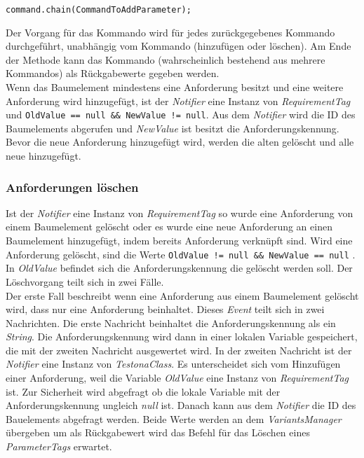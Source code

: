 \begin{lstlisting}
command.chain(CommandToAddParameter);
\end{lstlisting}

Der Vorgang für das Kommando wird für jedes zurückgegebenes Kommando durchgeführt, unabhängig vom Kommando (hinzufügen oder löschen). Am Ende der Methode kann das Kommando (wahrscheinlich bestehend aus mehrere Kommandos) als Rückgabewerte gegeben werden.\\


Wenn das Baumelement mindestens eine Anforderung besitzt und eine weitere Anforderung wird hinzugefügt, ist der \textit{Notifier} eine Instanz von \textit{RequirementTag} und \texttt{OldValue == null \&\& NewValue != null}. Aus dem \textit{Notifier} wird die ID des Baumelements abgerufen und \textit{NewValue} ist besitzt die Anforderungskennung. Bevor die neue Anforderung hinzugefügt wird, werden die alten gelöscht und alle neue hinzugefügt.\\


\subsubsection{Anforderungen löschen}
Ist der \textit{Notifier} eine Instanz von \textit{RequirementTag} so wurde eine Anforderung von einem Baumelement gelöscht oder es wurde eine neue Anforderung an einen Baumelement hinzugefügt, indem bereits Anforderung verknüpft sind. Wird eine Anforderung gelöscht, sind die Werte \texttt{OldValue != null \&\& NewValue == null} . In \textit{OldValue} befindet sich die Anforderungskennung die gelöscht werden soll. Der Löschvorgang teilt sich in zwei Fälle.\\


Der erste Fall beschreibt wenn eine Anforderung aus einem Baumelement gelöscht wird, dass nur eine Anforderung beinhaltet. Dieses \textit{Event} teilt sich in zwei Nachrichten. Die erste Nachricht beinhaltet die Anforderungskennung als ein \textit{String}. Die Anforderungskennung wird dann in einer lokalen Variable gespeichert, die mit der zweiten Nachricht ausgewertet wird. In der zweiten Nachricht ist der \textit{Notifier} eine Instanz von \textit{TestonaClass}. Es unterscheidet sich vom Hinzufügen einer Anforderung, weil die Variable \textit{OldValue} eine Instanz von \textit{RequirementTag} ist. Zur Sicherheit wird abgefragt ob die lokale Variable mit der Anforderungskennung ungleich \textit{null} ist. Danach kann aus dem \textit{Notifier} die ID des Bauelements abgefragt werden. Beide Werte werden an dem \textit{VariantsManager} übergeben um als Rückgabewert wird das Befehl für das Löschen eines \textit{ParameterTags}  erwartet.\\


